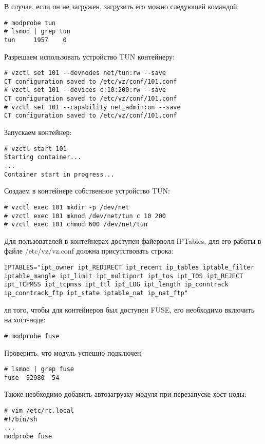 В случае, если он не загружен, загрузить его можно следующей командой:
\begin{lstlisting}
# modprobe tun
# lsmod | grep tun
tun     1957    0
\end{lstlisting}

Разрешаем использовать устройство TUN контейнеру:
\begin{lstlisting}
# vzctl set 101 --devnodes net/tun:rw --save
CT configuration saved to /etc/vz/conf/101.conf
# vzctl set 101 --devices c:10:200:rw --save
CT configuration saved to /etc/vz/conf/101.conf
# vzctl set 101 --capability net_admin:on --save
CT configuration saved to /etc/vz/conf/101.conf
\end{lstlisting}

Запускаем контейнер:
\begin{lstlisting}
# vzctl start 101
Starting container...
...
Container start in progress...
\end{lstlisting}

Создаем в контейнере собственное устройство TUN:
\begin{lstlisting}
# vzctl exec 101 mkdir -p /dev/net
# vzctl exec 101 mknod /dev/net/tun c 10 200
# vzctl exec 101 chmod 600 /dev/net/tun
\end{lstlisting}

Для пользователей в контейнерах доступен файерволл IPTables, для его работы в файле /etc/vz/vz.conf должна присутствовать строка:
\begin{lstlisting}
IPTABLES="ipt_owner ipt_REDIRECT ipt_recent ip_tables iptable_filter iptable_mangle ipt_limit ipt_multiport ipt_tos ipt_TOS ipt_REJECT ipt_TCPMSS ipt_tcpmss ipt_ttl ipt_LOG ipt_length ip_conntrack ip_conntrack_ftp ipt_state iptable_nat ip_nat_ftp"
\end{lstlisting}

ля того, чтобы для контейнеров был доступен FUSE, его необходимо включить на хост-ноде:
\begin{lstlisting}
# modprobe fuse
\end{lstlisting}

Проверить, что модуль успешно подключен:
\begin{lstlisting}
# lsmod | grep fuse
fuse  92980  54
\end{lstlisting}

Также необходимо добавить автозагрузку модуля при перезапуске хост-ноды:
\begin{lstlisting}
# vim /etc/rc.local
#!/bin/sh
...
modprobe fuse
\end{lstlisting}

